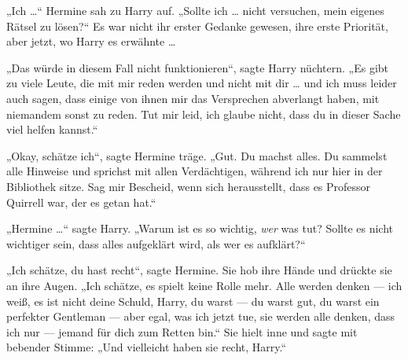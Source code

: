 „Ich …“ Hermine sah zu Harry auf.
„Sollte ich … nicht versuchen, mein eigenes Rätsel zu lösen?“ Es war nicht ihr erster Gedanke gewesen, ihre erste Priorität, aber jetzt, wo Harry es erwähnte …

„Das würde in diesem Fall nicht funktionieren“, sagte Harry nüchtern.
„Es gibt zu viele Leute, die mit mir reden werden und nicht mit dir … und ich muss leider auch sagen, dass einige von ihnen mir das Versprechen abverlangt haben, mit niemandem sonst zu reden. Tut mir leid, ich glaube nicht, dass du in dieser Sache viel helfen kannst.“

„Okay, schätze ich“, sagte Hermine träge.
„Gut. Du machst alles. Du sammelst alle Hinweise und sprichst mit allen Verdächtigen, während ich nur hier in der Bibliothek sitze. Sag mir Bescheid, wenn sich herausstellt, dass es Professor Quirrell war, der es getan hat.“

„Hermine …“ sagte Harry.
„Warum ist es so wichtig, \emph{wer} was tut? Sollte es nicht wichtiger sein, dass alles aufgeklärt wird, als wer es aufklärt?“

„Ich schätze, du hast recht“, sagte Hermine. Sie hob ihre Hände und drückte sie an ihre Augen.
„Ich schätze, es spielt keine Rolle mehr. Alle werden denken — ich weiß, es ist nicht deine Schuld, Harry, du warst — du warst gut, du warst ein perfekter Gentleman — aber egal, was ich jetzt tue, sie werden alle denken, dass ich nur — jemand für dich zum Retten bin.“ Sie hielt inne und sagte mit bebender Stimme:
„Und vielleicht haben sie recht, Harry.“


